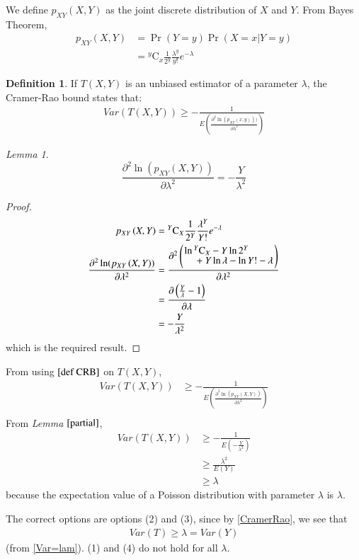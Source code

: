 \documentclass[twocolumn]{article}
\newcommand{\comb}[2]{{}^{#1}\mathrm{C}_{#2}}
\providecommand{\pr}[1]{\ensuremath{\Pr\left(#1\right)}}
\providecommand{\brak}[1]{\ensuremath{\left(#1\right)}}
\theoremstyle{remark}
\newtheorem{lemma}[theorem]{Lemma}
\theoremstyle{definition}
\newtheorem{definition}{Definition}[section]
\numberwithin{equation}{subsection}
\begin{document}
We define $ p_{XY}\brak{X, Y}$ as the joint discrete distribution of $X$ and $Y$.
From Bayes Theorem,
\begin{align}
    p_{XY}\brak{X, Y}&=\pr{Y=y}  \pr{X=x|Y=y}\\
    &= \comb{y}{x} \frac{1}{2^y} \frac{\lambda^y}{y!} e^{- \lambda}
\end{align}


\begin{definition} 
If $T(X, Y)$ is an unbiased estimator of a parameter $\lambda$, the Cramer-Rao bound states that:
\begin{align}
    Var\brak{T\brak{X,Y}}\geq -\frac{1}{E\brak{\frac{\partial^2 \ln(p_{XY}\brak{x, y}))}{\partial\lambda^2}}} \label{def CRB}
\end{align}
\end{definition}

\begin{lemma}\label{partial}
\begin{equation}
    \frac{\partial^2 \ln(p_{XY}\brak{X, Y})}{\partial\lambda^2}=-\frac{Y}{\lambda^2}
\end{equation}
\end{lemma}
\begin{proof}
\begin{align}
p_{XY}\brak{X, Y}&= \comb{Y}{X} \frac{1}{2^Y} \frac{\lambda^Y}{Y!}e^{- \lambda}\\
\frac{\partial^2 \ln(p_{XY}\brak{X, Y})}{\partial\lambda^2}&=\frac{\partial^2\brak{ \splitfrac{\ln{\comb{Y}{X}}-Y\ln{2^Y}}{+Y\ln{\lambda}-\ln{Y!}-\lambda}}}{\partial\lambda^2}\\
&=\frac{\partial\brak{ \frac{Y}{\lambda}-1}}{\partial\lambda}\\
&=-\frac{Y}{\lambda^2}
\end{align}
which is the required result.
\end{proof}
From using $\eqref{def CRB}$ on $T(X,Y)$,
\begin{align}
    Var(T(X, Y))&\geq -\frac{1}{E\brak{\frac{\partial^2 \ln(p_{XY}\brak{X, Y})}{\partial\lambda^2}}}\\
\end{align}
From \textit{Lemma} $\ref{partial}$,
\begin{align}
     Var(T(X, Y))&\geq-\frac{1}{E\brak{-\frac{Y}{\lambda^2}}}\\
    &\geq\frac{\lambda^2}{E\brak{Y}}\\
    &\geq \lambda \label{CramerRao}
\end{align}
because the expectation value of a Poisson distribution with parameter $\lambda$ is $\lambda$.

The correct options are options (2) and (3), since by \eqref{CramerRao}, we see that 
\begin{align*}
Var(T) \geq \lambda=Var(Y)
\end{align*}
(from \eqref{Var=lam}). (1) and (4) do not hold for all $\lambda$.
\end{document}
